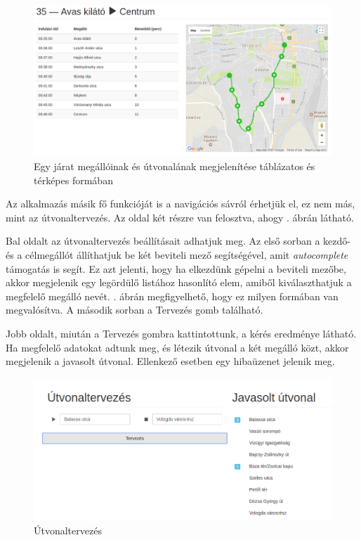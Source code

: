 \begin{figure}[h!]
\centering
\includegraphics[scale=0.35]{kepek/trip_tablazat_es_terkep.png}
\caption{Egy járat megállóinak és útvonalának megjelenítése táblázatos és térképes formában}
\label{fig:trip_tablazat_es_terkep}
\end{figure}

Az alkalmazás másik fő funkcióját is a navigációs sávról érhetjük el, ez nem más, mint az útvonaltervezés. Az oldal két részre van felosztva, ahogy . ábrán látható.

Bal oldalt az útvonaltervezés beállításait adhatjuk meg. Az első sorban a kezdő- és a célmegállót állíthatjuk be két beviteli mező segítségével, amit \textit{autocomplete} támogatás is segít. Ez azt jelenti, hogy ha elkezdünk gépelni a beviteli mezőbe, akkor megjelenik egy legördülő listához hasonlító elem, amiből kiválaszthatjuk a megfelelő megálló nevét. . ábrán megfigyelhető, hogy ez milyen formában van megvalósítva. A második sorban a Tervezés gomb található.

Jobb oldalt, miután a Tervezés gombra kattintottunk, a kérés eredménye látható. Ha megfelelő adatokat adtunk meg, és létezik útvonal a két megálló közt, akkor megjelenik a javasolt útvonal. Ellenkező esetben egy hibaüzenet jelenik meg.

\begin{figure}[h!]
\centering
\includegraphics[scale=0.45]{kepek/trip_planner.png}
\caption{Útvonaltervezés}
\label{fig:trip_planner}
\end{figure}


